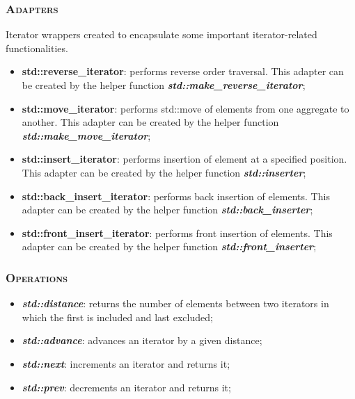 \documentclass[10pt]{article}
\begin{document}
\begin{multicols*}{5}
{\subsubsection*{\textsc{Adapters}} 
\noindent
Iterator wrappers created to encapsulate some important iterator-related functionalities. 
\begin{itemize}[leftmargin=*,topsep=0.25pt]
  \setlength\itemsep{.3pt}
	\item \textbf{std::reverse\_iterator}: performs reverse order traversal. This adapter can be created by the helper function \emph{\textbf{std::make\_reverse\_iterator}};
	\item \textbf{std::move\_iterator}: performs std::move of elements from one aggregate to another. This adapter can be created by the helper function \emph{\textbf{std::make\_move\_iterator}};
	\item \textbf{std::insert\_iterator}: performs insertion of element at a specified position. This adapter can be created by the helper function \emph{\textbf{std::inserter}};
	\item \textbf{std::back\_insert\_iterator}: performs back insertion of elements. This adapter can be created by the helper function \emph{\textbf{std::back\_inserter}};
	\item \textbf{std::front\_insert\_iterator}: performs front insertion of elements. This adapter can be created by the helper function \emph{\textbf{std::front\_inserter}};
\end{itemize}


\subsubsection*{\textsc{Operations}} 
\begin{itemize}[leftmargin=*,topsep=0.25pt]
  \setlength\itemsep{.3pt}
	\item  \emph{\textbf{std::distance}}: returns the number of elements between two iterators in which the first is included and last excluded;
	\item  \emph{\textbf{std::advance}}: advances an iterator by a given distance;
	\item  \emph{\textbf{std::next}}: increments an iterator and returns it;
	\item  \emph{\textbf{std::prev}}: decrements an iterator and returns it;
\end{itemize}
}
\end{multicols*}
\end{document}
